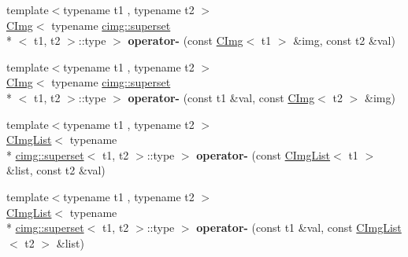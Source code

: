 \begin{DoxyCompactItemize}
\item 
\hypertarget{namespacecimg__library_acdcc55a47398052c9717f67c5325febf}{{\footnotesize template$<$typename t1 , typename t2 $>$ }\\\hyperlink{structcimg__library_1_1_c_img}{C\-Img}$<$ typename \hyperlink{structcimg__library_1_1cimg_1_1superset}{cimg\-::superset}\\*
$<$ t1, t2 $>$\-::type $>$ {\bfseries operator-\/} (const \hyperlink{structcimg__library_1_1_c_img}{C\-Img}$<$ t1 $>$ \&img, const t2 \&val)}\label{namespacecimg__library_acdcc55a47398052c9717f67c5325febf}

\item 
\hypertarget{namespacecimg__library_a7ae34a4a90749a1b6e2ca50b81374e68}{{\footnotesize template$<$typename t1 , typename t2 $>$ }\\\hyperlink{structcimg__library_1_1_c_img}{C\-Img}$<$ typename \hyperlink{structcimg__library_1_1cimg_1_1superset}{cimg\-::superset}\\*
$<$ t1, t2 $>$\-::type $>$ {\bfseries operator-\/} (const t1 \&val, const \hyperlink{structcimg__library_1_1_c_img}{C\-Img}$<$ t2 $>$ \&img)}\label{namespacecimg__library_a7ae34a4a90749a1b6e2ca50b81374e68}

\item 
\hypertarget{namespacecimg__library_aafa59e1c4c42c108e224369633d2c48d}{{\footnotesize template$<$typename t1 , typename t2 $>$ }\\\hyperlink{structcimg__library_1_1_c_img_list}{C\-Img\-List}$<$ typename \\*
\hyperlink{structcimg__library_1_1cimg_1_1superset}{cimg\-::superset}$<$ t1, t2 $>$\-::type $>$ {\bfseries operator-\/} (const \hyperlink{structcimg__library_1_1_c_img_list}{C\-Img\-List}$<$ t1 $>$ \&list, const t2 \&val)}\label{namespacecimg__library_aafa59e1c4c42c108e224369633d2c48d}

\item 
\hypertarget{namespacecimg__library_a8de12fa54c65054ebc3e5aeeefda97ae}{{\footnotesize template$<$typename t1 , typename t2 $>$ }\\\hyperlink{structcimg__library_1_1_c_img_list}{C\-Img\-List}$<$ typename \\*
\hyperlink{structcimg__library_1_1cimg_1_1superset}{cimg\-::superset}$<$ t1, t2 $>$\-::type $>$ {\bfseries operator-\/} (const t1 \&val, const \hyperlink{structcimg__library_1_1_c_img_list}{C\-Img\-List}$<$ t2 $>$ \&list)}\label{namespacecimg__library_a8de12fa54c65054ebc3e5aeeefda97ae}


\end{DoxyCompactItemize}
